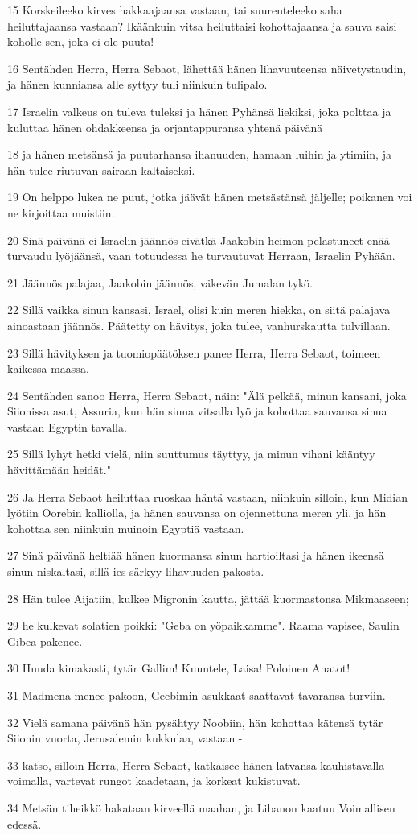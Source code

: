 \par 15 Korskeileeko kirves hakkaajaansa vastaan, tai suurenteleeko saha heiluttajaansa vastaan? Ikäänkuin vitsa heiluttaisi kohottajaansa ja sauva saisi koholle sen, joka ei ole puuta!
\par 16 Sentähden Herra, Herra Sebaot, lähettää hänen lihavuuteensa näivetystaudin, ja hänen kunniansa alle syttyy tuli niinkuin tulipalo.
\par 17 Israelin valkeus on tuleva tuleksi ja hänen Pyhänsä liekiksi, joka polttaa ja kuluttaa hänen ohdakkeensa ja orjantappuransa yhtenä päivänä
\par 18 ja hänen metsänsä ja puutarhansa ihanuuden, hamaan luihin ja ytimiin, ja hän tulee riutuvan sairaan kaltaiseksi.
\par 19 On helppo lukea ne puut, jotka jäävät hänen metsästänsä jäljelle; poikanen voi ne kirjoittaa muistiin.
\par 20 Sinä päivänä ei Israelin jäännös eivätkä Jaakobin heimon pelastuneet enää turvaudu lyöjäänsä, vaan totuudessa he turvautuvat Herraan, Israelin Pyhään.
\par 21 Jäännös palajaa, Jaakobin jäännös, väkevän Jumalan tykö.
\par 22 Sillä vaikka sinun kansasi, Israel, olisi kuin meren hiekka, on siitä palajava ainoastaan jäännös. Päätetty on hävitys, joka tulee, vanhurskautta tulvillaan.
\par 23 Sillä hävityksen ja tuomiopäätöksen panee Herra, Herra Sebaot, toimeen kaikessa maassa.
\par 24 Sentähden sanoo Herra, Herra Sebaot, näin: "Älä pelkää, minun kansani, joka Siionissa asut, Assuria, kun hän sinua vitsalla lyö ja kohottaa sauvansa sinua vastaan Egyptin tavalla.
\par 25 Sillä lyhyt hetki vielä, niin suuttumus täyttyy, ja minun vihani kääntyy hävittämään heidät."
\par 26 Ja Herra Sebaot heiluttaa ruoskaa häntä vastaan, niinkuin silloin, kun Midian lyötiin Oorebin kalliolla, ja hänen sauvansa on ojennettuna meren yli, ja hän kohottaa sen niinkuin muinoin Egyptiä vastaan.
\par 27 Sinä päivänä heltiää hänen kuormansa sinun hartioiltasi ja hänen ikeensä sinun niskaltasi, sillä ies särkyy lihavuuden pakosta.
\par 28 Hän tulee Aijatiin, kulkee Migronin kautta, jättää kuormastonsa Mikmaaseen;
\par 29 he kulkevat solatien poikki: "Geba on yöpaikkamme". Raama vapisee, Saulin Gibea pakenee.
\par 30 Huuda kimakasti, tytär Gallim! Kuuntele, Laisa! Poloinen Anatot!
\par 31 Madmena menee pakoon, Geebimin asukkaat saattavat tavaransa turviin.
\par 32 Vielä samana päivänä hän pysähtyy Noobiin, hän kohottaa kätensä tytär Siionin vuorta, Jerusalemin kukkulaa, vastaan -
\par 33 katso, silloin Herra, Herra Sebaot, katkaisee hänen latvansa kauhistavalla voimalla, vartevat rungot kaadetaan, ja korkeat kukistuvat.
\par 34 Metsän tiheikkö hakataan kirveellä maahan, ja Libanon kaatuu Voimallisen edessä.

